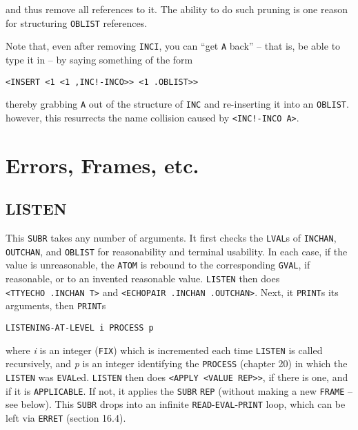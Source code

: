 \documentclass[a4paper]{scrbook}
\begin{document}
and thus remove all references to it. The ability to do such pruning is one reason for structuring \texttt{OBLIST}
references.

Note that, even after removing \texttt{INCI}, you can ``get \texttt{A} back'' -- that is, be able to type it in -- by
saying something of the form

\begin{verbatim}
<INSERT <1 <1 ,INC!-INCO>> <1 .OBLIST>>
\end{verbatim}

thereby grabbing \texttt{A} out of the structure of \texttt{INC} and re-inserting it into an \texttt{OBLIST}. however, this
resurrects the name collision caused by \texttt{\textless{}INC!-INCO\ A\textgreater{}}.

\chapter{Errors, Frames, etc.}\label{chapter-16.-errors-frames-etc.}

\section{LISTEN}\label{listen}

This \texttt{SUBR} takes any number of arguments. It first checks the \texttt{LVAL}s of
\texttt{INCHAN}, \texttt{OUTCHAN}, and
\texttt{OBLIST} for reasonability and terminal usability. In each case, if the value is
unreasonable, the \texttt{ATOM} is rebound to the corresponding \texttt{GVAL}, if reasonable, or to an invented reasonable
value. \texttt{LISTEN} then does
\texttt{\textless{}TTYECHO\ .INCHAN\ T\textgreater{}} and
\texttt{\textless{}ECHOPAIR\ .INCHAN\ .OUTCHAN\textgreater{}}. Next, it \texttt{PRINT}s its
arguments, then \texttt{PRINT}s

\begin{verbatim}
LISTENING-AT-LEVEL i PROCESS p
\end{verbatim}

where \emph{i} is an integer (\texttt{FIX}) which is incremented each time \texttt{LISTEN} is called recursively, and
\emph{p} is an integer identifying the \texttt{PROCESS} (chapter 20) in which the \texttt{LISTEN}
was \texttt{EVAL}ed. \texttt{LISTEN} then does
\texttt{\textless{}APPLY\ \textless{}VALUE\ REP\textgreater{}\textgreater{}}, if there is one, and if it is
\texttt{APPLICABLE}. If not, it applies the \texttt{SUBR} \texttt{REP} (without making a new
\texttt{FRAME} -- see below). This \texttt{SUBR} drops into an infinite \texttt{READ}-\texttt{EVAL}-\texttt{PRINT} loop,
which can be left via \texttt{ERRET} (section 16.4).
\end{document}
